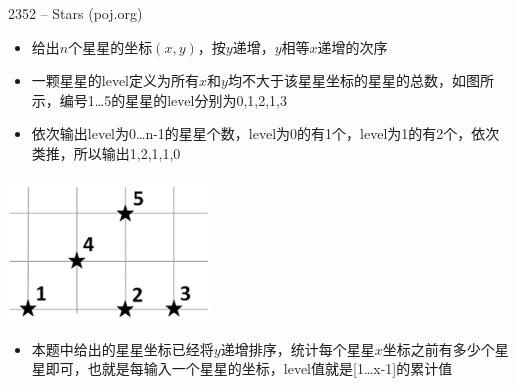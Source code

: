 \begin{frame}{2352 -- Stars (poj.org)}
    \begin{itemize}
        \item  给出$n$个星星的坐标$(x,y)$，按$y$递增，$y$相等$x$递增的次序
        \item 一颗星星的level定义为所有$x$和$y$均不大于该星星坐标的星星的总数，如图所示，编号1…5的星星的level分别为0,1,2,1,3
        \item 依次输出level为0…n-1的星星个数，level为0的有1个，level为1的有2个，依次类推，所以输出1,2,1,1,0
    \end{itemize}
    \includegraphics[width=0.4\textwidth,center]{fig/6-6.png}
    \begin{itemize}
        \item  本题中给出的星星坐标已经将$y$递增排序，统计每个星星$x$坐标之前有多少个星星即可，也就是每输入一个星星的坐标，level值就是[1…x-1]的累计值
    \end{itemize}
\end{frame}

